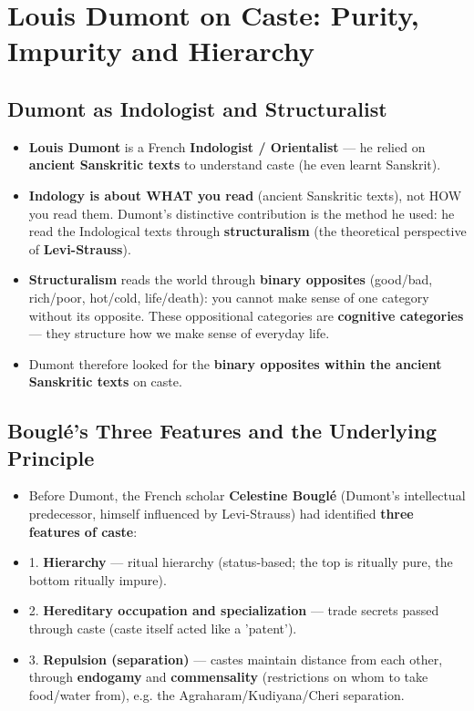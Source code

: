 \chapter{Louis Dumont on Caste: Purity, Impurity and Hierarchy}

\section{Dumont as Indologist and Structuralist}

\begin{KeyConcept}
\begin{itemize}
\item \textbf{Louis Dumont} is a French \textbf{Indologist / Orientalist} --- he relied on \textbf{ancient Sanskritic texts} to understand caste (he even learnt Sanskrit).
\item \textbf{Indology is about WHAT you read} (ancient Sanskritic texts), not HOW you read them. Dumont's distinctive contribution is the method he used: he read the Indological texts through \textbf{structuralism} (the theoretical perspective of \textbf{Levi-Strauss}).
\item \textbf{Structuralism} reads the world through \textbf{binary opposites} (good/bad, rich/poor, hot/cold, life/death): you cannot make sense of one category without its opposite. These oppositional categories are \textbf{cognitive categories} --- they structure how we make sense of everyday life.
\item Dumont therefore looked for the \textbf{binary opposites within the ancient Sanskritic texts} on caste.
\end{itemize}
\end{KeyConcept}

\section{Bouglé's Three Features and the Underlying Principle}

\begin{KeyConcept}
\begin{itemize}
\item Before Dumont, the French scholar \textbf{Celestine Bouglé} (Dumont's intellectual predecessor, himself influenced by Levi-Strauss) had identified \textbf{three features of caste}:
\item 1. \textbf{Hierarchy} --- ritual hierarchy (status-based; the top is ritually pure, the bottom ritually impure).
\item 2. \textbf{Hereditary occupation and specialization} --- trade secrets passed through caste (caste itself acted like a 'patent').
\item 3. \textbf{Repulsion (separation)} --- castes maintain distance from each other, through \textbf{endogamy} and \textbf{commensality} (restrictions on whom to take food/water from), e.g. the Agraharam/Kudiyana/Cheri separation.
\end{itemize}
\end{KeyConcept}

